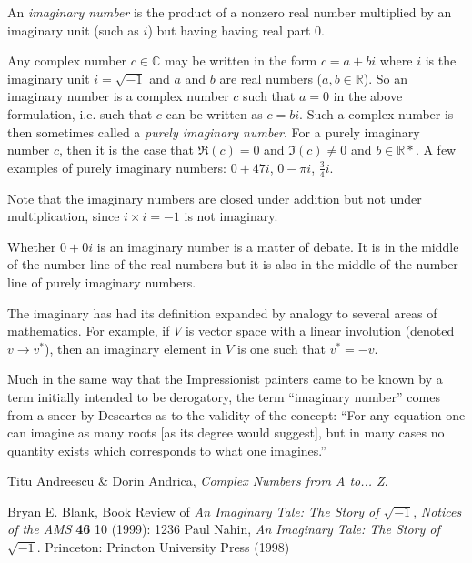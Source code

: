\documentclass{article}
\newcommand{\reals}{\mathbb{R}}
\begin{document}
An \emph{imaginary number} is the product of a nonzero real number multiplied by an imaginary unit (such as $i$) but having having real part 0.

Any complex number $c \in \mathbb{C}$ may be written in the form $c = a + b i$ where $i$ is the imaginary unit $i = \sqrt{-1}$ and $a$ and $b$ are real numbers ($a, b \in \reals$). So an imaginary number is a complex number $c$ such that $a = 0$ in the above formulation, i.e. such that $c$ can be written as $c = b i$. Such a complex number is then sometimes called a {\em purely imaginary number}. For a purely imaginary number $c$, then it is the case that $\Re(c) = 0$ and $\Im(c) \neq 0$ and $b \in \mathbb{R}*$.  A few examples of purely imaginary numbers: $0 + 47i$, $0 - \pi i$, $\frac{3}{4} i$.

Note that the imaginary numbers are closed under addition but not under multiplication, since $i \times i = -1$ is not imaginary.

Whether $0 + 0i$ is an imaginary number is a matter of debate. It is in the middle of the number line of the real numbers but it is also in the middle of the number line of purely imaginary numbers.

The  imaginary has had its definition expanded by analogy to several areas of mathematics.  For example, if $V$ is vector space with a linear involution (denoted $v\rightarrow v^*$), then an imaginary element in $V$ is one such that $v^* = -v$.

Much in the same way that the Impressionist painters came to be known by a term initially intended to be derogatory, the term ``imaginary number'' comes from a sneer by Descartes as to the validity of the concept: ``For any equation one can imagine as many roots [as its degree would suggest], but in many cases no quantity exists which corresponds to what one imagines.''

\begin{thebibliography}{2}
 Titu Andreescu \& Dorin Andrica, {\it Complex Numbers from A to... Z}.


 Bryan E. Blank, Book Review of {\it An Imaginary Tale: The Story of $\sqrt{-1}$}, {\it Notices of the AMS} {\bf 46} 10 (1999): 1236
 Paul Nahin, {\it An Imaginary Tale: The Story of $\sqrt{-1}$}. Princeton: Princton University Press (1998)
\end{thebibliography}
\end{document}
